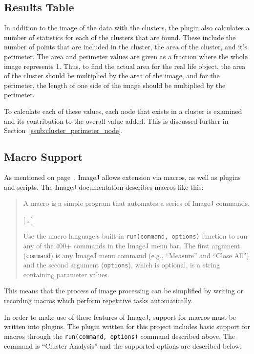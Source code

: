 \subsection{Results Table}
\label{sub:results_table}

In addition to the image of the data with the clusters, the plugin also
calculates a number of statistics for each of the clusters that are found.
These include the number of points that are included in the cluster, the area
of the cluster, and it's perimeter. The area and perimeter values are given as
a fraction where the whole image represents 1. Thus, to find the actual area
for the real life object, the area of the cluster should be multiplied by the
area of the image, and for the perimeter, the length of one side of the image
should be multiplied by the perimeter.

To calculate each of these values, each node that exists in a cluster is
examined and its contribution to the overall value added. This is discussed
further in Section~\ref{ssub:cluster_perimeter_node}.

\subsection{Macro Support}
\label{sub:macro_support}

As mentioned on page~\pageref{part:imagej_plugin}, ImageJ allows extension via
macros, as well as plugins and scripts. The ImageJ documentation describes
macros like this:

\begin{quote}
	A macro is a simple program that automates a series of ImageJ
	commands.

	[\,\ldots]

	Use the macro language's built-in \texttt{run(command,
	options)} function to run any of the 400+ commands in the ImageJ menu
	bar.  The first argument (\texttt{command}) is any ImageJ menu command
	(e.g., ``Measure'' and ``Close All'') and the second argument
	(\texttt{options}), which is optional, is a string containing parameter
	values.\\
	\hspace*{\fill}\cite{imagejapi}
\end{quote}

This means that the process of image processing can be simplified by writing or
recording macros which perform repetitive tasks automatically.

In order to make use of these features of ImageJ, support for macros must be
written into plugins. The plugin written for this project includes basic
support for macros through the \texttt{run(command, options)} command described
above. The command is ``Cluster Analysis'' and the supported options are
described below.

